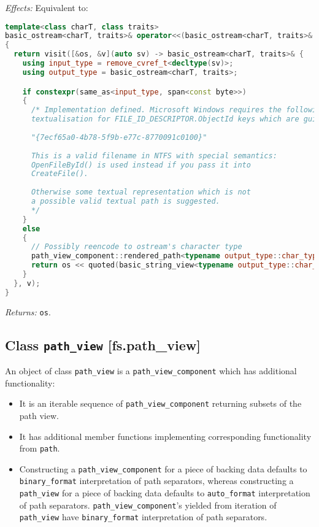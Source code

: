 \documentclass[11pt]{article}
\newcommand{\code}[2][cpp]{\lstinline[language=#1,basicstyle=\small\ttfamily]{#2}}
\newcommand{\desc}[1]{\textit{#1}}
\newcommand{\effects}{\desc{Effects: }}
\newcommand{\returns}{\desc{Returns: }}
\begin{document}
\effects Equivalent to:\begin{lstlisting}[language=cpp]
template<class charT, class traits>
basic_ostream<charT, traits>& operator<<(basic_ostream<charT, traits>& os, path_view_component v)
{
  return visit([&os, &v](auto sv) -> basic_ostream<charT, traits>& {
    using input_type = remove_cvref_t<decltype(sv)>;
    using output_type = basic_ostream<charT, traits>;

    if constexpr(same_as<input_type, span<const byte>>)
    {
      /* Implementation defined. Microsoft Windows requires the following
      textualisation for FILE_ID_DESCRIPTOR.ObjectId keys which are guids:
      
      "{7ecf65a0-4b78-5f9b-e77c-8770091c0100}"
      
      This is a valid filename in NTFS with special semantics:
      OpenFileById() is used instead if you pass it into
      CreateFile().
      
      Otherwise some textual representation which is not
      a possible valid textual path is suggested.
      */
    }
    else
    {
      // Possibly reencode to ostream's character type
      path_view_component::rendered_path<typename output_type::char_type> zbuff(v, path_view_component::not_zero_terminated);
      return os << quoted(basic_string_view<typename output_type::char_type>(zbuff.buffer, zbuff.length));
    }
  }, v);
}
\end{lstlisting}

\returns \code{os}.\\

\subsection*{Class \code{path_view} [fs.path\_view]}

An object of class \code{path_view} is a \code{path_view_component} which has additional functionality:
\begin{itemize}
    \item It is an iterable sequence of \code{path_view_component} returning subsets of the path view.
    \item It has additional member functions implementing corresponding functionality from \code{path}.
    \item Constructing a \code{path_view_component} for a piece of backing data defaults to \code{binary_format} interpretation of path separators, whereas constructing a \code{path_view} for a piece of backing data defaults to \code{auto_format} interpretation of path separators. \code{path_view_component}'s yielded from iteration of \code{path_view} have \code{binary_format} interpretation of path separators.
\end{itemize}
\end{document}
